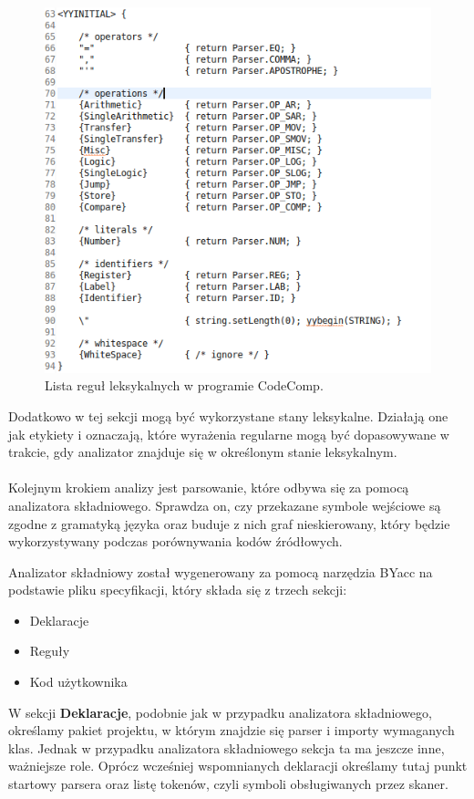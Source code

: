 \documentclass[a4paper,12pt]{article}
\begin{document}
\begin{figure}[h]
\centering
\includegraphics[scale=0.7]{gfx/actions.png}
\caption{Lista reguł leksykalnych w programie CodeComp.}
\end{figure}

Dodatkowo w tej sekcji mogą być wykorzystane stany leksykalne. Działają one jak etykiety i oznaczają, które wyrażenia regularne mogą być dopasowywane w trakcie, gdy analizator znajduje się w określonym stanie leksykalnym.
\\ \\

Kolejnym krokiem analizy jest parsowanie, które odbywa się za pomocą analizatora składniowego. Sprawdza on, czy przekazane symbole wejściowe są zgodne z gramatyką języka oraz buduje z nich graf nieskierowany, który będzie wykorzystywany podczas porównywania kodów źródłowych.

Analizator składniowy został wygenerowany za pomocą narzędzia BYacc\cite{byacc} na podstawie pliku specyfikacji, który składa się z trzech sekcji:
\begin{itemize}
\item Deklaracje
\item Reguły
\item Kod użytkownika
\end{itemize}

W sekcji \textbf{Deklaracje}, podobnie jak w przypadku analizatora składniowego, określamy pakiet projektu, w którym znajdzie się parser i importy wymaganych klas. Jednak w przypadku analizatora składniowego sekcja ta ma jeszcze inne, ważniejsze role. Oprócz wcześniej wspomnianych deklaracji określamy tutaj punkt startowy parsera oraz listę tokenów, czyli symboli obsługiwanych przez skaner.
\end{document}
